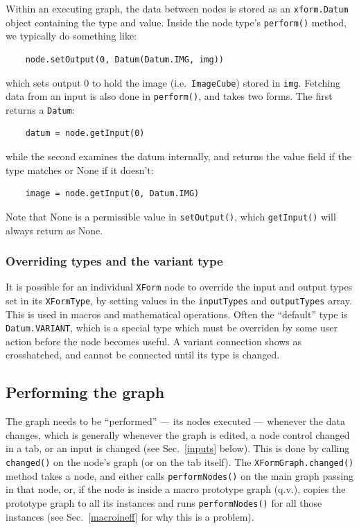 Within an executing graph, the data between nodes is stored as an \texttt{xform.Datum}
object containing the type and value. Inside the node type's \texttt{perform()} method,
we typically do something like:
\begin{lstlisting}
    node.setOutput(0, Datum(Datum.IMG, img))
\end{lstlisting}
which sets output 0 to hold the image (i.e.\ \texttt{ImageCube}) stored in \texttt{img}.
Fetching data from an input is also done in \texttt{perform()}, and takes two forms. The
first returns a \texttt{Datum}:
\begin{lstlisting}
    datum = node.getInput(0)
\end{lstlisting}
while the second examines the datum internally, and returns the value field if
the type matches or None if it doesn't:
\begin{lstlisting}
    image = node.getInput(0, Datum.IMG)
\end{lstlisting}
Note that None is a permissible value in \texttt{setOutput()}, which \texttt{getInput()} will
always return as None.

\subsubsection{Overriding types and the variant type}
It is possible for an individual \texttt{XForm} node to override the input and output types
set in its \texttt{XFormType}, by setting values in the \texttt{inputTypes} and \texttt{outputTypes}
array. This is used in macros and mathematical operations. Often the ``default'' type is \texttt{Datum.VARIANT},
which is a special type which must be overriden by some user action before the node becomes useful. A variant connection
shows as crosshatched, and cannot be connected until its type is changed.

\subsection{Performing the graph}
\label{graphperform}
The graph needs to be ``performed'' --- its nodes executed --- whenever
the data changes, which is generally whenever the graph is edited,
a node control changed in a tab, or an input is changed (see Sec.~\ref{inputs}
below).
This is done by calling \texttt{changed()} on the node's graph (or on the tab itself).
The \texttt{XFormGraph.changed()} method takes a node, and either calls
\texttt{performNodes()} on the main graph passing in that node, or, if the
node is inside a macro prototype graph (q.v.), copies the prototype graph to
all its instances and runs \texttt{performNodes()} for all those instances
(see Sec.~\ref{macroineff} for why this is a problem).

